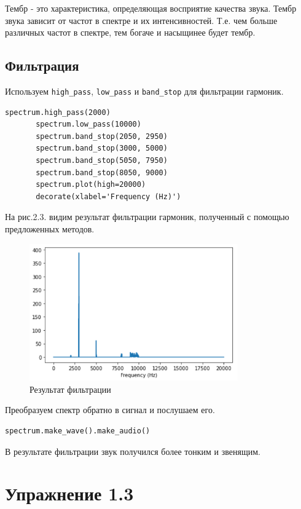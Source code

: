 \documentclass[a4paper,12pt]{report}
\begin{document}
    Тембр - это характеристика, определяющая восприятие качества звука. Тембр звука зависит от частот в спектре и их интенсивностей. Т.е. чем больше различных частот в спектре, тем богаче и насыщинее будет тембр.

\section{Фильтрация}
    Используем \texttt{high\_pass}, \texttt{low\_pass} и \texttt{band\_stop} для фильтрации гармоник.
\begin{lstlisting}[caption=Выполнение фильтрации]
       spectrum.high_pass(2000)
       spectrum.low_pass(10000)
       spectrum.band_stop(2050, 2950)
       spectrum.band_stop(3000, 5000)
       spectrum.band_stop(5050, 7950)
       spectrum.band_stop(8050, 9000)
       spectrum.plot(high=20000)
       decorate(xlabel='Frequency (Hz)')
\end{lstlisting}  

    На рис.2.3. видим результат фильтрации гармоник, полученный с помощью предложенных методов.

\begin{figure}[H]
        \centering
        \includegraphics[width=0.8\textwidth]{fig2-3.PNG}
        \caption{Результат фильтрации}
        \label{fig:fig2-3}
\end{figure}

    Преобразуем спектр обратно в сигнал и послушаем его.
\begin{lstlisting}[caption=Преобразование спектра в сигнал]
       spectrum.make_wave().make_audio()
\end{lstlisting}      
  
    В результате фильтрации звук получился более тонким и звенящим.

\chapter{Упражнение 1.3}
\end{document}
